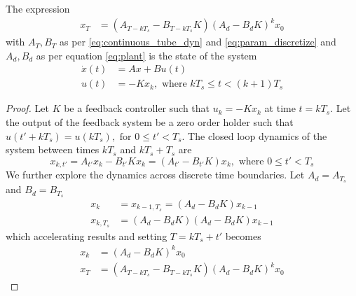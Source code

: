 \documentclass[sigconf]{llncs}
\newcommand{\mat}[1]{{#1}}
\renewcommand{\vec}[1]{{#1}}
\begin{document}
\begin{theorem}
The expression
 \begin{align}
 \vec{x}_{T} &= (\mat{A}_{T-kT_s}-\mat{B}_{T-kT_s}\mat{K}) (\mat{A}_d-\mat{B}_d\mat{K})^k\vec{x}_0
 \label{eq:cyber_feedback}
 \end{align}
 with $\mat{A}_T, \mat{B}_T$ as per \eqref{eq:continuous_tube_dyn} and \eqref{eq:param_discretize} and $\mat{A}_d, \mat{B}_d$ as per equation \eqref{eq:plant} is the state of the system
 \begin{align*}
 \dot{\vec{x}}({t}) &= \mat{A}\vec{x}+\mat{B}\vec{u}(t)\nonumber\\
 \vec{u}(t)&=-\mat{K}\vec{x}_k, \text{ where }  kT_s \leq t < (k+1)T_s
 \end{align*}
 \end{theorem}

\begin{proof}
%
Let $\mat{K}$ be a feedback controller such that
$\vec{u}_k=-\mat{K}\vec{x}_k$ at time $t=kT_s$.  Let the output of the
feedback system be a zero order holder such that
$\vec{u}(t'+kT_s)=\vec{u}(kT_s), \text{ for } 0 \leq t' < T_s$.  The closed
loop dynamics of the system between times $kT_s$ and $kT_s+T_s$ are
%
\begin{equation*}
\vec{x}_{k,t'}=\mat{A}_{t'}\vec{x}_k-\mat{B}_{t'}\mat{K}\vec{x}_k = (\mat{A}_{t'}-\mat{B}_{t'}\mat{K})\vec{x}_k, \text{ where }  0 \leq t' < T_s
\end{equation*}
We further explore the dynamics across discrete time boundaries. Let $\mat{A}_d=\mat{A}_{T_s}$ and $\mat{B}_d=\mat{B}_{T_s}$
\begin{align*}
\vec{x}_{k}&=\vec{x}_{k-1,T_s}= (\mat{A}_d-\mat{B}_d\mat{K})\vec{x}_{k-1}\\
\vec{x}_{k,T_s} &= (\mat{A}_d-\mat{B}_d\mat{K}) (\mat{A}_d-\mat{B}_d\mat{K})\vec{x}_{k-1}
\end{align*}
which accelerating results and setting $T=kT_s+t'$ becomes
\begin{align}
\label{eq:feedback_sampled_cont}
\vec{x}_{k} &= (\mat{A}_d-\mat{B}_d\mat{K}) ^k\vec{x}_0\\
\vec{x}_{T} &= (\mat{A}_{T-kT_s}-\mat{B}_{T-kT_s}\mat{K}) (\mat{A}_d-\mat{B}_d\mat{K})^k\vec{x}_0
\label{eq:feedback_cont}
\end{align}
\end{proof}

\end{document}

